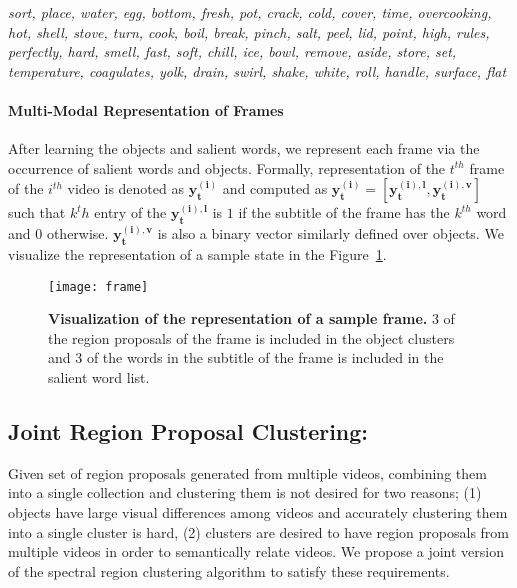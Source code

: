 \footnotesize
\emph{sort, place, water, egg, bottom, fresh, pot, crack, cold, cover, time, overcooking, hot, shell, stove, turn, cook, boil, break, pinch, salt, peel, lid, point, high, rules, perfectly, hard, smell, fast, soft, chill, ice, bowl, remove, aside, store, set, temperature, coagulates, yolk, drain, swirl, shake, white, roll, handle, surface, flat}
\normalsize

\paragraph{Multi-Modal Representation of Frames}
After learning the objects and salient words, we represent each frame via the occurrence of salient words and objects. Formally, representation of the $t^{th}$ frame of the $i^{th}$ video is denoted as $\mathbf{y^{(i)}_t}$ and computed as $\mathbf{y^{(i)}_t}=[\mathbf{y^{(i),l}_t},\mathbf{y^{(i),v}_t}]$ such that $k^th$ entry of the $\mathbf{y^{(i),l}_t}$ is $1$ if the subtitle of the frame has the $k^{th}$ word and $0$ otherwise. $\mathbf{y^{(i),v}_t}$ is also a binary vector similarly defined over objects. We visualize the representation of a sample state in the Figure~\ref{visFrame}.
\begin{figure}[h!]
  \texttt{[image: frame]}
  \caption{\textbf{Visualization of the representation of a sample frame.} 3 of the region proposals of the frame is included in the object clusters and 3 of the words in the subtitle of the frame is included in the salient word list.}
  \label{visFrame}
\end{figure}

\subsection{Joint Region Proposal Clustering:}
\label{jointProp}
Given set of region proposals generated from multiple videos, combining them into a single collection and clustering them is not desired for two reasons; (1) objects have large visual differences among videos and accurately clustering them into a single cluster is hard, (2) clusters are desired to have region proposals from multiple videos in order to semantically relate videos. We propose a joint version of the spectral region clustering algorithm to satisfy these requirements.

